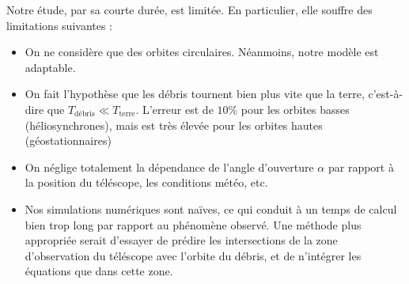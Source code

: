 \documentclass[a4paper,11pt]{article}
\numberwithin{section}{part}
\begin{document}
Notre étude, par sa courte durée, est limitée. En particulier, elle
souffre des limitations suivantes :

\begin{itemize}
\item On ne considère que des orbites circulaires. Néanmoins, notre
  modèle est adaptable.
\item On fait l'hypothèse que les débris tournent bien plus vite que
  la terre, c'est-à-dire que $T_{\text{débris}} \ll
  T_{\text{terre}}$. L'erreur est de $10\%$ pour les orbites basses
  (héliosynchrones), mais est très élevée pour les orbites hautes
  (géostationnaires)
\item On néglige totalement la dépendance de l'angle d'ouverture
  $\alpha$ par rapport à la position du téléscope, les conditions
  météo, etc.
\item Nos simulations numériques sont naïves, ce qui conduit à un
  temps de calcul bien trop long par rapport au phénomène observé. Une
  méthode plus appropriée serait d'essayer de prédire les
  intersections de la zone d'observation du téléscope avec l'orbite du
  débris, et de n'intégrer les équations que dans cette zone.
\end{itemize}



\appendix


% 


\begin{thebibliography}{99}
\end{thebibliography}
\end{document}

